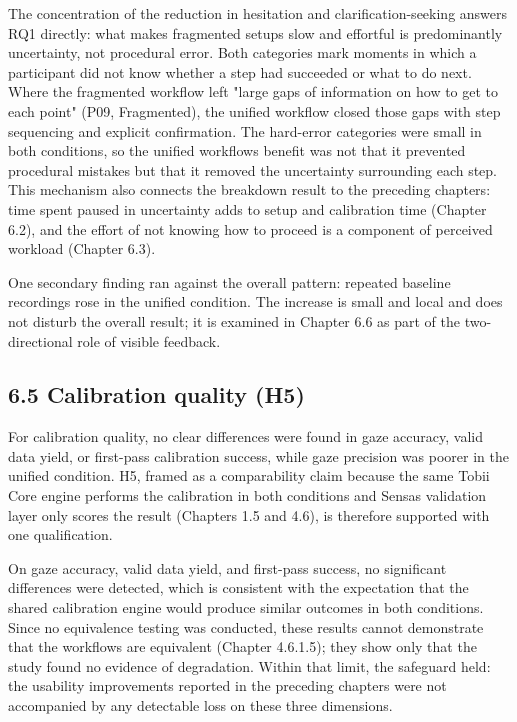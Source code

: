 \documentclass[
]{article}
\begin{document}
The concentration of the reduction in hesitation and clarification-seeking answers RQ1 directly: what makes fragmented setups slow and effortful is predominantly uncertainty, not procedural error. Both categories mark moments in which a participant did not know whether a step had succeeded or what to do next. Where the fragmented workflow left "large gaps of information on how to get to each point" (P09, Fragmented), the unified workflow closed those gaps with step sequencing and explicit confirmation. The hard-error categories were small in both conditions, so the unified workflow\textquotesingle s benefit was not that it prevented procedural mistakes but that it removed the uncertainty surrounding each step. This mechanism also connects the breakdown result to the preceding chapters: time spent paused in uncertainty adds to setup and calibration time (Chapter 6.2), and the effort of not knowing how to proceed is a component of perceived workload (Chapter 6.3).

One secondary finding ran against the overall pattern: repeated baseline recordings rose in the unified condition. The increase is small and local and does not disturb the overall result; it is examined in Chapter 6.6 as part of the two-directional role of visible feedback.

\hypertarget{calibration-quality-h5-1}{%
\subsection{6.5 Calibration quality (H5)}\label{calibration-quality-h5-1}}

For calibration quality, no clear differences were found in gaze accuracy, valid data yield, or first-pass calibration success, while gaze precision was poorer in the unified condition. H5, framed as a comparability claim because the same Tobii Core engine performs the calibration in both conditions and Sensa\textquotesingle s validation layer only scores the result (Chapters 1.5 and 4.6), is therefore supported with one qualification.

On gaze accuracy, valid data yield, and first-pass success, no significant differences were detected, which is consistent with the expectation that the shared calibration engine would produce similar outcomes in both conditions. Since no equivalence testing was conducted, these results cannot demonstrate that the workflows are equivalent (Chapter 4.6.1.5); they show only that the study found no evidence of degradation. Within that limit, the safeguard held: the usability improvements reported in the preceding chapters were not accompanied by any detectable loss on these three dimensions.
\end{document}
